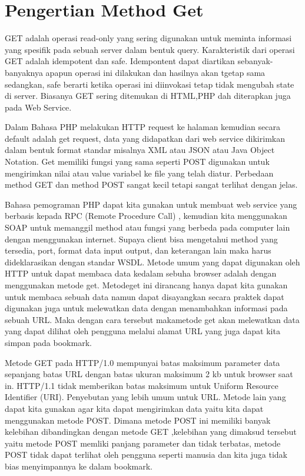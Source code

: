 \section{Pengertian Method Get}
GET adalah operasi read-only yang sering digunakan untuk meminta informasi yang spesifik pada sebuah server dalam bentuk query. 
Karakteristik dari operasi GET adalah idempotent dan safe. Idempontent dapat diartikan sebanyak-banyaknya apapun operasi ini dilakukan 
dan 
hasilnya akan tgetap sama sedangkan, safe berarti ketika operasi ini diinvokasi tetap tidak mengubah state di server.
Biasanya GET sering ditemukan di HTML,PHP dah diterapkan juga pada Web Service.

Dalam Bahasa PHP melakukan HTTP request ke halaman kemudian secara default adalah get request, data yang didapatkan dari web service 
dikirimkan dalam bentuk format standar misalnya XML atau JSON atau Java Object Notation. Get memiliki fungsi yang sama seperti POST 
digunakan untuk mengirimkan nilai atau value variabel ke file yang telah diatur. Perbedaan method GET dan method POST sangat kecil 
tetapi sangat terlihat dengan jelas.

Bahasa pemograman PHP dapat kita gunakan untuk membuat web service yang  berbasis kepada RPC (Remote Procedure Call) , kemudian kita 
menggunakan SOAP untuk memanggil method atau fungsi yang berbeda pada computer lain dengan menggunakan internet. Supaya client bisa 
mengetahui method yang tersedia, port, format data input output, dan keterangan lain maka harus  dideklarasikan dengan standar WSDL.    
Metode umum yang dapat digunakan oleh HTTP untuk dapat membaca data kedalam sebuha browser adalah dengan menggunakan metode get. 
Metodeget ini dirancang hanya dapat kita gunakan untuk membaca sebuah data namun dapat disayangkan secara praktek dapat digunakan juga untuk melewatkan data dengan menambahkan informasi pada sebuah URL. Maka dengan cara tersebut makametode get akan melewatkan data yang dapat dilihat oleh pengguna melalui alamat URL yang juga dapat kita simpan pada bookmark.

Metode GET pada HTTP/1.0 mempunyai batas maksimum parameter data sepanjang batas URL dengan batas ukuran maksimum 2 kb untuk browser 
saat in. HTTP/1.1 tidak memberikan batas maksimum untuk Uniform Resource Identifier (URI). Penyebutan yang lebih umum untuk URL. Metode 
lain yang dapat kita gunakan agar kita dapat  mengirimkan data yaitu kita dapat menggunakan  metode POST. Dimana metode  POST ini 
memiliki banyak kelebihan dibandingkan dengan  metode GET ,kelebihan yang dimaksud tersebut yaitu metode POST  memliki panjang 
parameter dan tidak  terbatas,  metode POST tidak dapat terlihat oleh pengguna  seperti manusia dan  kita juga tidak bias menyimpannya 
ke dalam bookmark.

